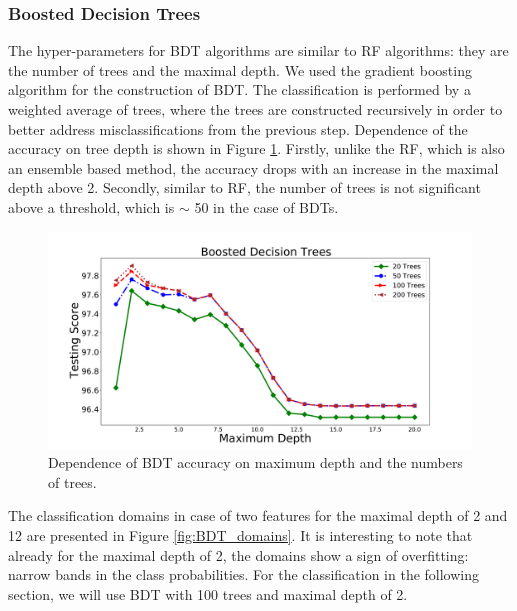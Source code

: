 \subsubsection{Boosted Decision Trees}

The hyper-parameters for BDT algorithms are similar to RF algorithms: they are the number of trees and the maximal depth.
We used the gradient boosting algorithm for the construction of BDT.
The classification is performed by a weighted average of trees, where the trees are constructed recursively in order to better address 
misclassifications from the previous step. 
Dependence of the accuracy on tree depth is shown in Figure \ref{fig:BDT_depth}. 
Firstly, unlike the RF, which is also an ensemble based method, the accuracy drops with an increase in the maximal depth above 2. Secondly, similar to RF, the number of trees is not significant above a threshold, which is $\sim$ 50 in the case of BDTs.

\begin{figure}[h]
\includegraphics[width=\twopicsp\textwidth]{plots/bdt_train.pdf}
\caption{Dependence of BDT accuracy on maximum depth and the numbers of trees.}
\label{fig:BDT_depth}
\end{figure}

The classification domains in case of two features for the maximal depth of 2 and 12 are presented in Figure \ref{fig:BDT_domains}. 
It is interesting to note that already for the maximal depth of 2, the domains show a sign of overfitting: narrow bands in the class probabilities. For the classification in the following section, we will use BDT with 100 trees and maximal depth of 2.

